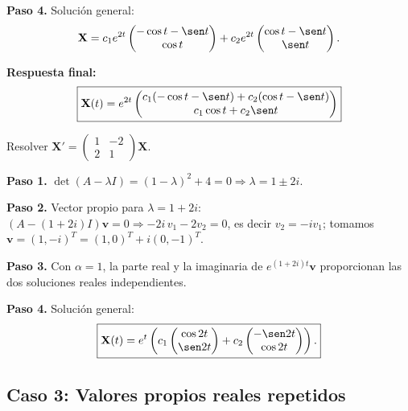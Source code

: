 \begin{example}
\begin{myproof}
\textbf{Paso 4.} Solución general:
\[
\mathbf{X}=c_1 e^{2t}
\begin{pmatrix}
-\cos t-\sen t\\
\cos t
\end{pmatrix}
+c_2 e^{2t}
\begin{pmatrix}
\cos t-\sen t\\
\sen t
\end{pmatrix}.
\]

\textbf{Respuesta final:}
\[
\boxed{
\mathbf{X}(t)=e^{2t}
\begin{pmatrix}
c_1(-\cos t-\sen t)+c_2(\cos t-\sen t)\\
c_1\cos t+c_2\sen t
\end{pmatrix}
}
\]
\end{myproof}
\end{example}

\begin{example}
Resolver $\mathbf{X}'=\begin{pmatrix}1&-2\\2&1\end{pmatrix}\mathbf{X}$.

\begin{myproof}
\textbf{Paso 1.} $\det(A-\lambda I)=(1-\lambda)^2+4=0\Rightarrow \lambda=1\pm 2i$.

\textbf{Paso 2.} Vector propio para $\lambda=1+2i$: $(A-(1+2i)I)\mathbf{v}=0\Rightarrow -2i\,v_1-2v_2=0$, es decir $v_2=-i v_1$; tomamos $\mathbf{v}=(1,-i)^T=(1,0)^T+i(0,-1)^T$.

\textbf{Paso 3.} Con $\alpha=1$, la parte real y la imaginaria de $e^{(1+2i)t}\mathbf{v}$ proporcionan las dos soluciones reales independientes.

\textbf{Paso 4.} Solución general:
\[
\boxed{\mathbf{X}(t)=e^{t}\left(c_1\begin{pmatrix}\cos 2t\\ \sen 2t\end{pmatrix}+c_2\begin{pmatrix}-\sen 2t\\ \cos 2t\end{pmatrix}\right).}
\]
\end{myproof}
\end{example}

\subsection{Caso 3: Valores propios reales repetidos}

